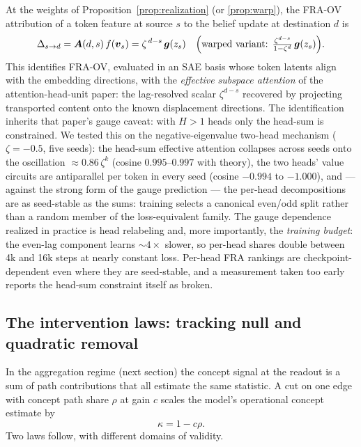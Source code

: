 \documentclass{article}
\newcommand{\vb}{\boldsymbol{v}}
\newcommand{\gb}{\boldsymbol{g}}
\newcommand{\Ab}{\boldsymbol{A}}
\theoremstyle{definition}
\begin{document}
At the weights of Proposition~\ref{prop:realization} (or \ref{prop:warp}),
the FRA-OV attribution of a token feature at source $s$ to the belief update
at destination $d$ is
\begin{equation}\label{ovclosed}
\Delta_{s\to d} = \Ab(d,s)\, f(\vb_s)
= \zeta^{\,d-s}\, \gb(z_s) \quad
\Bigl(\text{warped variant: } \tfrac{\zeta^{d-s}}{1-\zeta^d}\, \gb(z_s)\Bigr).
\end{equation}
This identifies FRA-OV, evaluated in an SAE basis whose token latents align
with the embedding directions, with the \emph{effective subspace attention}
of the attention-head-unit paper: the lag-resolved scalar $\zeta^{d-s}$
recovered by projecting transported content onto the known displacement
directions. The identification inherits that paper's gauge caveat: with
$H > 1$ heads only the head-sum is constrained. We tested this on the
negative-eigenvalue two-head mechanism ($\zeta = -0.5$, five seeds): the
head-sum effective attention collapses across seeds onto the oscillation
$\approx 0.86\,\zeta^k$ (cosine $0.995$--$0.997$ with theory), the two
heads' value circuits are antiparallel per token in every seed (cosine
$-0.994$ to $-1.000$), and --- against the strong form of the gauge
prediction --- the per-head decompositions are as seed-stable as the sums:
training selects a canonical even/odd split rather than a random member of
the loss-equivalent family. The gauge dependence realized in practice is
head relabeling and, more importantly, the \emph{training budget}: the
even-lag component learns $\sim 4\times$ slower, so per-head shares double
between 4k and 16k steps at nearly constant loss. Per-head FRA rankings are
checkpoint-dependent even where they are seed-stable, and a measurement
taken too early reports the head-sum constraint itself as broken.

\subsection{The intervention laws: tracking null and quadratic removal}

In the aggregation regime (next section) the concept signal at the readout
is a sum of path contributions that all estimate the same statistic. A cut
on one edge with concept path share $\rho$ at gain $c$ scales the model's
operational concept estimate by
\begin{equation}
\kappa = 1 - c\rho .
\end{equation}
Two laws follow, with different domains of validity.
\end{document}
